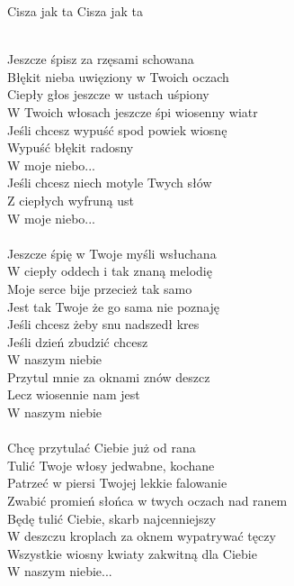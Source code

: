 {Cisza jak ta}
{Cisza jak ta}
\begin{text}
\vin \\
Jeszcze śpisz za rzęsami schowana \\
Błękit nieba uwięziony w Twoich oczach \\
Ciepły głos jeszcze w ustach uśpiony \\
W Twoich włosach jeszcze śpi wiosenny wiatr \\

\vin Jeśli chcesz wypuść spod powiek wiosnę \\
\vin Wypuść błękit radosny \\
\vin W moje niebo... \\
\vin Jeśli chcesz niech motyle Twych słów \\
\vin Z ciepłych wyfruną ust \\
\vin W moje niebo... \\
\vin \\

Jeszcze śpię w Twoje myśli wsłuchana \\
W ciepły oddech i tak znaną melodię \\
Moje serce bije przecież tak samo \\
Jest tak Twoje że go sama nie poznaję \\

\vin Jeśli chcesz żeby snu nadszedł kres \\
\vin Jeśli dzień zbudzić chcesz \\
\vin W naszym niebie \\
\vin Przytul mnie za oknami znów deszcz \\
\vin Lecz wiosennie nam jest \\
\vin W naszym niebie \\
\vin \\

Chcę przytulać Ciebie już od rana \\
Tulić Twoje włosy jedwabne, kochane \\
Patrzeć w piersi Twojej lekkie falowanie \\
Zwabić promień słońca w twych oczach nad ranem \\

Będę tulić Ciebie, skarb najcenniejszy \\
W deszczu kroplach za oknem wypatrywać tęczy \\
Wszystkie wiosny kwiaty zakwitną dla Ciebie \\
W naszym niebie... \\


\end{text}
